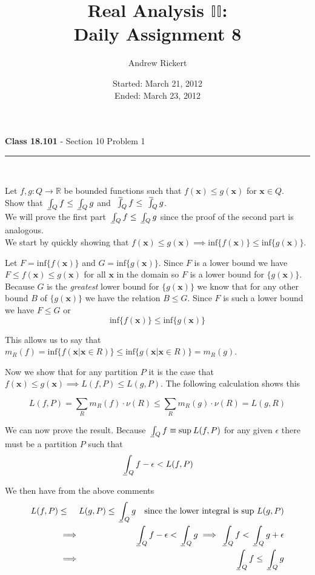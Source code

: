 \documentclass[11pt,reqno]{article}
\title{Real Analysis $\mathbb{II}$: \\ Daily Assignment 8}
\author{Andrew Rickert}
\date{Started: March 21, 2012 \\ \hspace{1pt} Ended: March 23,  2012}                                           %
\def\uint{\mathchoice%
    {\mkern13mu\overline{\vphantom{\intop}\mkern9mu}\mkern-20mu}%
    {\mkern9mu\overline{\vphantom{\intop}\mkern9mu}\mkern-14mu}%
    {\mkern9mu\overline{\vphantom{\intop}\mkern9mu}\mkern-14mu}%
    {\mkern9mu\overline{\vphantom{\intop}\mkern9mu}\mkern-14mu}%
  \int}
\def\lint{\mkern3mu\underline{\vphantom{\intop}\mkern9mu}\mkern-10mu\int}
\begin{document}
\maketitle


\begin{flushleft} 
\textbf{Class 18.101} - Section 10 Problem 1\\
\rule{500pt}{1pt}\\
\end{flushleft} 

Let $f,g : Q \to \mathbb{R}$ be bounded functions such that $f(\textbf{x}) \le g(\textbf{x})$ for $\textbf{x} \in Q$. \\
Show that $\lint_Q f \le \lint_Q g$ and $\uint_Q f \le \uint_Q g$.\\

We will prove the first part $\lint_Q f \le \lint_Q g$ since the proof of the second part is analogous.\\
We start by quickly showing that $f(\textbf{x}) \le g(\textbf{x}) \implies \text{inf} \{ f(\textbf{x}) \} \le  \text{inf} \{ g(\textbf{x}) \}$.

Let $F = \text{inf} \{ f(\textbf{x}) \}$ and $G = \text{inf} \{ g(\textbf{x}) \}$. Since $F$ is a lower bound we have $F \le f(\textbf{x}) \le g(\textbf{x})$ for all $\textbf{x}$ in the domain so $F$ is a lower bound for $\{ g(\textbf{x}) \}$. Because $G$ is the \emph{greatest} lower bound for $\{ g(\textbf{x}) \}$ we know that for any other bound $B$ of $\{ g(\textbf{x}) \}$ we have the relation $B \le G$. Since $F$ is such a lower bound we have $F \le G$ or \[ \text{inf} \{ f(\textbf{x}) \} \le  \text{inf} \{ g(\textbf{x}) \} \]

This allows us to say that $m_R(f) = \text{inf} \{ f(\textbf{x} | \textbf{x} \in R)\} \le \text{inf} \{ g(\textbf{x} | \textbf{x} \in R)\} = m_R(g)$.

Now we show that for any partition $P$ it is the case that $f(\textbf{x}) \le g(\textbf{x}) \implies L(f,P) \le L(g,P)$. The following calculation shows this 

\[
L(f,P) = \sum_R m_R(f) \cdot \nu (R) \le \sum_R m_R(g) \cdot \nu(R)= L(g,R)
\]

We can now prove the result. Because $\lint_Q f \equiv \text{sup} \: L(f,P)$ for any given $\epsilon$ there must be a partition $P$ such that 
\[ \lint_Q f - \epsilon < L(f,P) \]

\noindent We then have from the above comments
\begin{eqnarray*} 
L(f,P) &\le& \hspace{-10pt} L(g,P) \le \lint_Q g \quad \text{since the lower integral is sup $L(g,P)$} \\
	 &\implies& \lint_Q f - \epsilon < \lint_Q g \implies \lint_Q f < \lint_Q g  + \epsilon \\
	 &\implies& \lint_Q f \le \lint_Q g
\end{eqnarray*}
\newpage
\end{document}

